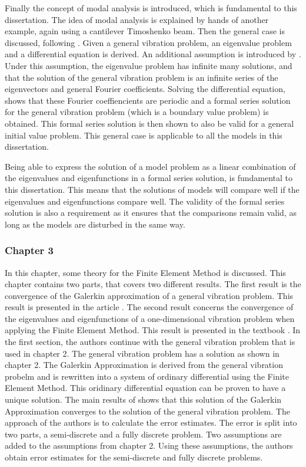 \documentclass[../main.tex]{subfiles}
\begin{document}
Finally the concept of modal analysis is introduced, which is fundamental to this dissertation. The idea of modal analysis is explained by hands of another example, again using a cantilever Timoshenko beam. Then the general case is discussed, following \cite{CVV18}. Given a general vibration problem, an eigenvalue problem and a differential equation is derived. An additional assumption is introduced by \cite{CVV18}. Under this assumption, the eigenvalue problem has infinite many solutions, and that the solution of the general vibration problem is an infinite series of the eigenvectors and general Fourier coefficients. Solving the differential equation, shows that these Fourier coeffiencients are periodic and a formal series solution for the general vibration problem (which is a boundary value problem) is obtained. This formal series solution is then shown to also be valid for a general initial value problem. This general case is applicable to all the models in this dissertation.

Being able to express the solution of a model problem as a linear combination of the eigenvalues and eigenfunctions in a formal series solution, is fundamental to this dissertation. This means that the solutions of models will compare well if the eigenvalues and eigenfunctions compare well. The validity of the formal series solution is also a requirement as it ensures that the comparisons remain valid, as long as the models are disturbed in the same way.

\subsubsection{Chapter 3}
In this chapter, some theory for the Finite Element Method is discussed. This chapter contains two parts, that covers two different results. The first result is the convergence of the Galerkin approximation of a general vibration problem. This result is presented in the article \cite{BV13}. The second result concerns the convergence of the eigenvalues and eigenfunctions of a one-dimensional vibration problem when applying the Finite Element Method. This result is presented in the textbook \cite{SF97}. In the first section, the authors continue with the general vibration problem that is used in chapter 2. The general vibration problem has a solution as shown in chapter 2. The Galerkin Approximation is derived from the general vibration probelm and is rewritten into a system of ordinary differential using the Finite Element Method. This oridinary differential equation can be proven to have a unique solution. The main results of \cite{BV13} shows that this solution of the Galerkin Approximation converges to the solution of the general vibration problem. The approach of the authors is to calculate the error estimates. The error is split into two parts, a semi-discrete and a fully discrete problem. Two assumptions are added to the assumptions from chapter 2. Using these assumptions, the authors obtain error estimates for the semi-discrete and fully discrete problems.
\end{document}
